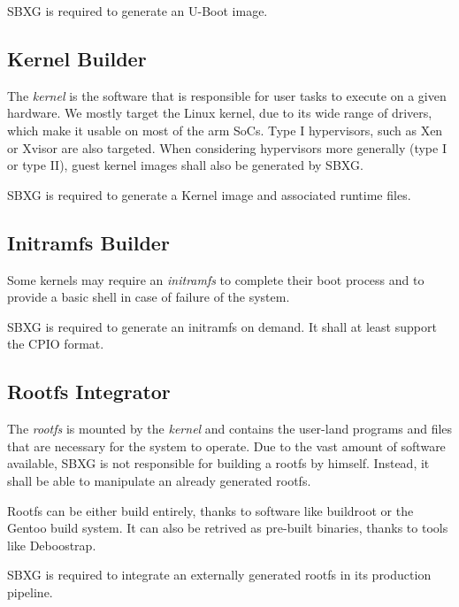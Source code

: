 \documentclass{article}
\begin{document}
SBXG is required to generate an U-Boot image.

\subsection{Kernel Builder}

The \emph{kernel} is the software that is responsible for user tasks to execute
on a given hardware. We mostly target the Linux kernel, due to its wide range of
drivers, which make it usable on most of the arm SoCs.
Type I hypervisors, such as Xen or Xvisor are also targeted. When considering
hypervisors more generally (type I or type II), guest kernel images shall also
be generated by SBXG.

SBXG is required to generate a Kernel image and associated runtime files.

\subsection{Initramfs Builder}

Some kernels may require an \emph{initramfs} to complete their boot process and
to provide a basic shell in case of failure of the system.

SBXG is required to generate an initramfs on demand. It shall at least support
the CPIO format.

\subsection{Rootfs Integrator}

The \emph{rootfs} is mounted by the \emph{kernel} and contains the user-land
programs and files that are necessary for the system to operate. Due to the vast
amount of software available, SBXG is not responsible for building a rootfs by
himself. Instead, it shall be able to manipulate an already generated rootfs.

Rootfs can be either build entirely, thanks to software like buildroot or the
Gentoo build system. It can also be retrived as pre-built binaries, thanks to
tools like Deboostrap.

SBXG is required to integrate an externally generated rootfs in its production
pipeline.
\end{document}
